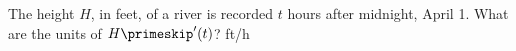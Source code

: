 {The height $H$, in feet, of a river is recorded $t$ hours after midnight, April 1. What are the units of $H\primeskip'(t)$?
}
{ft/h
}
